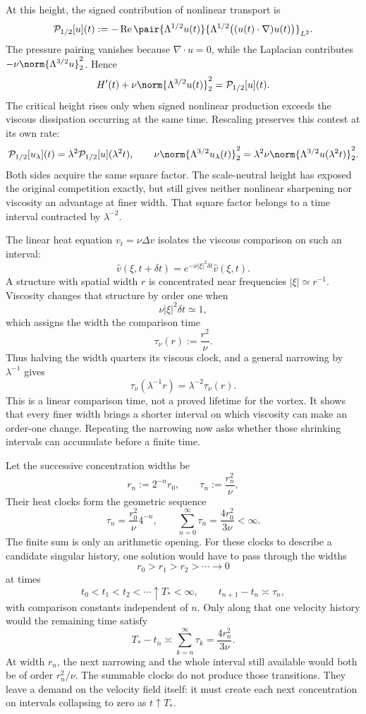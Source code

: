
At this height, the signed contribution of nonlinear transport is
\[
  \mathcal P_{1/2}[u](t)
  :=
  -\operatorname{Re}
  \pair
    {\Lambda^{1/2}u(t)}
    {\Lambda^{1/2}\bigl((u(t)\cdot\nabla)u(t)\bigr)}_{L^2}.
\]
The pressure pairing vanishes because \(\nabla\cdot u=0\), while the Laplacian contributes \(-\nu\norm{\Lambda^{3/2}u}_2^2\). Hence
\[
  H'(t)
  +
  \nu\norm{\Lambda^{3/2}u(t)}_2^2
  =
  \mathcal P_{1/2}[u](t).
\]
The critical height rises only when signed nonlinear production exceeds the viscous dissipation occurring at the same time. Rescaling preserves this contest at its own rate:
\[
  \mathcal P_{1/2}[u_\lambda](t)
  =
  \lambda^2\mathcal P_{1/2}[u](\lambda^2t),
  \qquad
  \nu\norm{\Lambda^{3/2}u_\lambda(t)}_2^2
  =
  \lambda^2\nu\norm{\Lambda^{3/2}u(\lambda^2t)}_2^2.
\]
Both sides acquire the same square factor. The scale-neutral height has exposed the original competition exactly, but still gives neither nonlinear sharpening nor viscosity an advantage at finer width. That square factor belongs to a time interval contracted by \(\lambda^{-2}\).


The linear heat equation \(v_t=\nu\Delta v\) isolates the viscous comparison on such an interval:
\[
  \widehat v(\xi,t+\delta t)
  =
  e^{-\nu|\xi|^2\delta t}\widehat v(\xi,t).
\]
A structure with spatial width \(r\) is concentrated near frequencies \(|\xi|\simeq r^{-1}\). Viscosity changes that structure by order one when
\[
  \nu|\xi|^2\delta t\simeq1,
\]
which assigns the width the comparison time
\[
  \tau_\nu(r)
  :=
  \frac{r^2}{\nu}.
\]
Thus halving the width quarters its viscous clock, and a general narrowing by \(\lambda^{-1}\) gives
\[
  \tau_\nu(\lambda^{-1}r)
  =
  \lambda^{-2}\tau_\nu(r).
\]
This is a linear comparison time, not a proved lifetime for the vortex. It shows that every finer width brings a shorter interval on which viscosity can make an order-one change. Repeating the narrowing now asks whether those shrinking intervals can accumulate before a finite time.


Let the successive concentration widths be
\[
  r_n:=2^{-n}r_0,
  \qquad
  \tau_n:=\frac{r_n^2}{\nu},
\]
Their heat clocks form the geometric sequence
\[
  \tau_n
  =
  \frac{r_0^2}{\nu}4^{-n},
  \qquad
  \sum_{n=0}^{\infty}\tau_n
  =
  \frac{4r_0^2}{3\nu}
  <
  \infty.
\]
The finite sum is only an arithmetic opening. For these clocks to describe a candidate singular history, one \NavierStokes{} solution would have to pass through the widths
\[
  r_0>r_1>r_2>\cdots\longrightarrow0
\]
at times
\[
  t_0<t_1<t_2<\cdots\uparrow T_*<\infty,
  \qquad
  t_{n+1}-t_n\asymp\tau_n,
\]
with comparison constants independent of \(n\). Only along that one velocity history would the remaining time satisfy
\[
  T_*-t_n
  \asymp
  \sum_{k=n}^{\infty}\tau_k
  =
  \frac{4r_n^2}{3\nu}.
\]
At width \(r_n\), the next narrowing and the whole interval still available would both be of order \(r_n^2/\nu\). The summable clocks do not produce those transitions. They leave a demand on the velocity field itself: it must create each next concentration on intervals collapsing to zero as \(t\uparrow T_*\).
